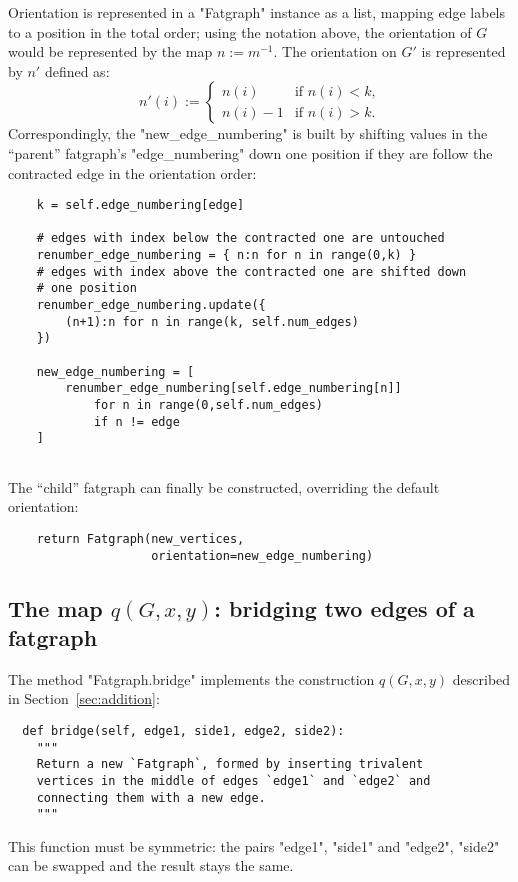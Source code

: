 Orientation is represented in a "Fatgraph" instance as a list, mapping
edge labels to a position in the total order; using the notation
above, the orientation of $G$ would be represented by the map
$n := m^{-1}$.  The orientation on $G'$ is represented by $n'$ defined
as:
\begin{equation*}
  n'(i) :=
  \begin{cases}
    n(i)    &\text{if $n(i)<k$,} 
    \\
    n(i)-1  &\text{if $n(i)>k$.}
  \end{cases}
\end{equation*}
Correspondingly, the "new_edge_numbering" is built by shifting values
in the ``parent'' fatgraph's "edge_numbering" down one position if
they are follow the contracted edge in the orientation order:
\begin{lstlisting}
    k = self.edge_numbering[edge]

    # edges with index below the contracted one are untouched
    renumber_edge_numbering = { n:n for n in range(0,k) }
    # edges with index above the contracted one are shifted down
    # one position
    renumber_edge_numbering.update({ 
        (n+1):n for n in range(k, self.num_edges) 
    })

    new_edge_numbering = [ 
        renumber_edge_numbering[self.edge_numbering[n]]
            for n in range(0,self.num_edges)
            if n != edge 
    ]
    
\end{lstlisting}

The ``child'' fatgraph can finally be constructed, overriding the
default orientation:
\begin{lstlisting}
    return Fatgraph(new_vertices, 
                    orientation=new_edge_numbering)

\end{lstlisting}


\subsection{The map $q(G,x,y)$: bridging two edges of a fatgraph}
\label{sec:bridge}

The method "Fatgraph.bridge" implements the construction $q(G,x,y)$
described in Section~\ref{sec:addition}:
\begin{lstlisting}
  def bridge(self, edge1, side1, edge2, side2):
    """
    Return a new `Fatgraph`, formed by inserting trivalent
    vertices in the middle of edges `edge1` and `edge2` and
    connecting them with a new edge.
    """
\end{lstlisting}
This function must be symmetric: the pairs "edge1", "side1" and
"edge2", "side2" can be swapped and the result stays the same.

